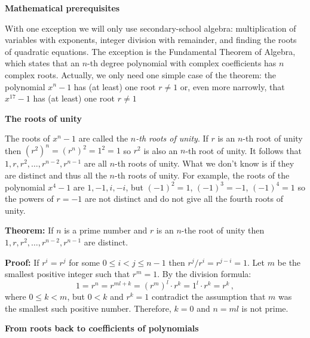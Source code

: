 \documentclass[a4paper,11pt]{article}
\begin{document}
\textbf{Mathematical prerequisites}

With one exception we will only use secondary-school algebra: multiplication of variables with exponents,
integer division with remainder,
and finding the roots of quadratic equations.
The exception is the Fundamental Theorem of Algebra, which states that an $n$-th degree polynomial with complex coefficients has $n$ complex roots. Actually, we only need one simple case of the theorem: the polynomial $x^{n}-1$ has (at least) one root $r\neq 1$ or, even more narrowly, that $x^{17}-1$ has (at least) one root $r\neq 1$

%

\textbf{The roots of unity}

The roots of $x^{n}-1$ are called the \emph{$n$-th roots of unity}. If $r$ is an $n$-th root of unity then $(r^{2})^n=(r^{n})^2=1^2=1$ so $r^2$ is also an $n$-th root of unity. It follows that $1, r, r^2, \ldots, r^{n-2}, r^{n-1}$ are all $n$-th roots of unity. What we don't know is if they are distinct and thus all the $n$-th roots of unity. For example, the roots of the polynomial $x^4-1$ are $1,-1,i,-i$, but $(-1)^2=1$, $(-1)^3=-1$, $(-1)^4=1$ so the powers of $r=-1$ are not distinct and do not give all the fourth roots of unity.

\textbf{Theorem:} If $n$ is a prime number and $r$ is an $n$-the root of unity then $1,r,r^2,\ldots,r^{n-2},r^{n-1}$ are distinct.

\textbf{Proof:} If $r^i=r^j$ for some $0\leq i<j\leq n-1$ then $r^j/r^i=r^{j-i}=1$. Let $m$ be the smallest positive integer such that $r^{m}=1$. By the division formula:
\[
1=r^n=r^{ml+k}=(r^m)^l\cdot r^k=1^l\cdot r^k=r^k\,,
\]
where $0\leq k<m$, but $0<k$ and $r^k=1$ contradict the assumption that $m$ was the smallest such positive number. Therefore, $k=0$ and $n=ml$ is not prime.

\textbf{From roots back to coefficients of polynomials}
\end{document}
